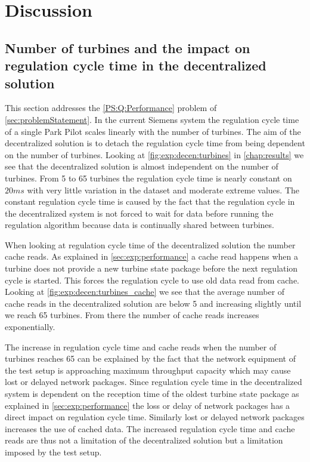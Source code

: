 \chapter{Discussion}

\section{Number of turbines and the impact on regulation cycle time in the decentralized solution}
This section addresses the \ref{PS:Q:Performance} problem of \cref{sec:problemStatement}. In the current Siemens system the regulation cycle time of a single Park Pilot scales linearly with the number of turbines.
The aim of the decentralized solution is to detach the regulation cycle time from being dependent on the number of turbines. 
Looking at \cref{fig:exp:decen:turbines} in \cref{chap:results} we see that the decentralized solution is almost independent on the number of turbines.
From 5 to 65 turbines the regulation cycle time is nearly constant on $20 ms$ with very little variation in the dataset and moderate extreme values.
The constant regulation cycle time is caused by the fact that the regulation cycle in the decentralized system is not forced to wait for data before running the regulation algorithm because data is continually shared between turbines.

When looking at regulation cycle time of the decentralized solution the number cache reads.
As explained in \cref{sec:exp:performance} a cache read happens when a turbine does not provide a new turbine state package before the next regulation cycle is started.
This forces the regulation cycle to use old data read from cache.
Looking at \cref{fig:exp:decen:turbines_cache} we see that the average number of cache reads in the decentralized solution are below 5 and increasing slightly until we reach 65 turbines. From there the number of cache reads increases exponentially.

The increase in regulation cycle time and cache reads when the number of turbines reaches 65 can be explained by the fact that the network equipment of the test setup is approaching maximum throughput capacity which may cause lost or delayed network packages.
Since regulation cycle time in the decentralized system is dependent on the reception time of the oldest turbine state package as explained in \cref{sec:exp:performance} the loss or delay of network packages has a direct impact on regulation cycle time.
Similarly lost or delayed network packages increases the use of cached data. The increased regulation cycle time and cache reads are thus not a limitation of the decentralized solution but a limitation imposed by the test setup.

